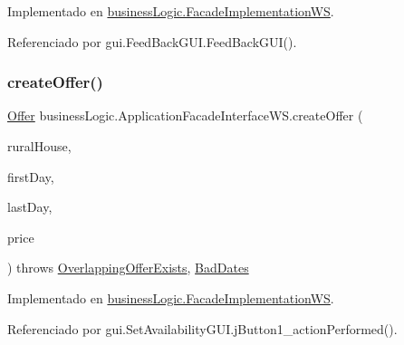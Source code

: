 Implementado en \mbox{\hyperlink{classbusiness_logic_1_1_facade_implementation_w_s_a415b0ef5c66ce3bcec46a33750dc469f}{business\+Logic.\+Facade\+Implementation\+WS}}.



Referenciado por gui.\+Feed\+Back\+G\+U\+I.\+Feed\+Back\+G\+U\+I().

\mbox{\label{interfacebusiness_logic_1_1_application_facade_interface_w_s_a0e8d2135ef1384a32e74f60bcea55f09}} 
\subsubsection{\texorpdfstring{createOffer()}{createOffer()}}
{\footnotesize\ttfamily \mbox{\hyperlink{classdomain_1_1_offer}{Offer}} business\+Logic.\+Application\+Facade\+Interface\+W\+S.\+create\+Offer (\begin{DoxyParamCaption}\item[{\mbox{\hyperlink{classdomain_1_1_rural_house}{Rural\+House}}}]{rural\+House,  }\item[{Date}]{first\+Day,  }\item[{Date}]{last\+Day,  }\item[{float}]{price }\end{DoxyParamCaption}) throws \mbox{\hyperlink{classexceptions_1_1_overlapping_offer_exists}{Overlapping\+Offer\+Exists}}, \mbox{\hyperlink{classexceptions_1_1_bad_dates}{Bad\+Dates}}}



Implementado en \mbox{\hyperlink{classbusiness_logic_1_1_facade_implementation_w_s_ac7b3bdfd0815ea7c787da312de594cce}{business\+Logic.\+Facade\+Implementation\+WS}}.



Referenciado por gui.\+Set\+Availability\+G\+U\+I.\+j\+Button1\+\_\+action\+Performed().

\mbox{\label{interfacebusiness_logic_1_1_application_facade_interface_w_s_a3e5553805d4890c9c17cf2ab1b14a2d3}} 
